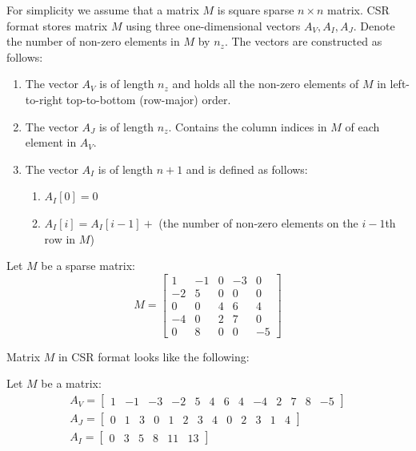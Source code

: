 \documentclass[en]{minipw} %
\begin{document}
For simplicity we assume that a matrix $M$ is square sparse $n \times n$ matrix. CSR format stores matrix $M$ using three one-dimensional vectors $A_{V}, A_{I}, A_{J}$. Denote the number of non-zero elements in $M$ by $n_{z}$. The vectors are constructed as follows:
\begin{enumerate}
\item The vector $A_{V}$ is of length $n_{z}$ and holds all the non-zero elements of $M$ in left-to-right top-to-bottom (row-major) order.
\item The vector $A_{J}$ is of length $n_{z}$. Contains the column indices in $M$ of each element in $A_{V}$.
\item The vector $A_{I}$ is of length $n+1$ and is defined as follows:
\begin{enumerate}
\item $A_{I}[0] = 0$ 
\item $A_{I}[i] = A_{I}[i-1] +$ (the number of non-zero elements on the $i-1$th row in $M$)\end{enumerate}
\end{enumerate}

\begin{example}
Let $M$ be a sparse matrix:
\begin{equation}
M =
\begin{bmatrix}
1 & -1 & 0 & -3 & 0 \\
-2 & 5 & 0 & 0 & 0 \\
0 & 0 & 4 & 6 & 4 \\
-4 & 0 & 2 & 7 & 0 \\
0 & 8 & 0 & 0 & -5
\end{bmatrix}
\end{equation}

Matrix $M$ in CSR format looks like the following:

Let $M$ be a matrix:
\begin{equation}
\begin{aligned}
A_{V} =
\begin{bmatrix}
1 & -1 & -3 & -2 & 5 & 4 & 6 & 4 & -4 & 2 & 7 & 8 & -5
\end{bmatrix}
\\
A_{J} =
\begin{bmatrix}
0 & 1 & 3 & 0 & 1 & 2 & 3 & 4 & 0 & 2 & 3 & 1 & 4
\end{bmatrix}
\\
A_{I} =
\begin{bmatrix}
0 & 3 & 5 & 8 & 11 & 13
\end{bmatrix}
\end{aligned}
\end{equation}

\end{example}
\end{document}
